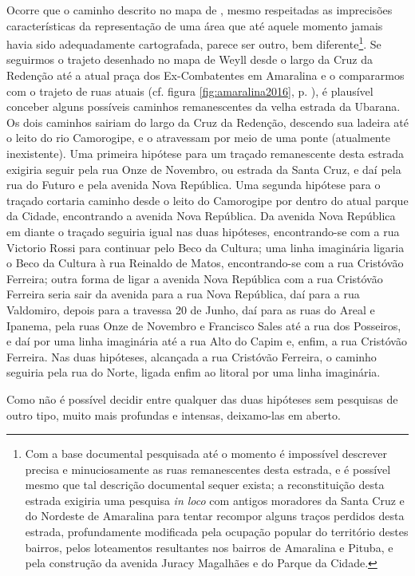 Ocorre que o caminho descrito no mapa de , mesmo respeitadas as imprecisões características da representação de uma área que até aquele momento jamais havia sido adequadamente cartografada, parece ser outro, bem diferente\footnote{Com a base documental pesquisada até o momento é impossível descrever precisa e minuciosamente as ruas remanescentes desta estrada, e é possível mesmo que tal descrição documental sequer exista; a reconstituição desta estrada exigiria uma pesquisa \textit{in loco} com antigos moradores da Santa Cruz e do Nordeste de Amaralina para tentar recompor alguns traços perdidos desta estrada, profundamente modificada pela ocupação popular do território destes bairros, pelos loteamentos resultantes nos bairros de Amaralina e Pituba, e pela construção da avenida Juracy Magalhães e do Parque da Cidade.}. Se seguirmos o trajeto desenhado no mapa de Weyll desde o largo da Cruz da Redenção até a atual praça dos Ex-Combatentes em Amaralina e o compararmos com o trajeto de ruas atuais (cf. figura \autoref{fig:amaralina2016}, p. \pageref{fig:amaralina2016}), é plausível conceber alguns possíveis caminhos remanescentes da velha estrada da Ubarana. Os dois caminhos sairiam do largo da Cruz da Redenção, descendo sua ladeira até o leito do rio Camorogipe, e o atravessam por meio de uma ponte (atualmente inexistente). Uma primeira hipótese para um traçado remanescente desta estrada exigiria seguir pela rua Onze de Novembro, ou estrada da Santa Cruz, e daí pela rua do Futuro e pela avenida Nova República. Uma segunda hipótese para o traçado cortaria caminho desde o leito do Camorogipe por dentro do atual parque da Cidade, encontrando a avenida Nova República. Da avenida Nova República em diante o traçado seguiria igual nas duas hipóteses, encontrando-se com a rua Victorio Rossi para continuar pelo Beco da Cultura; uma linha imaginária ligaria o Beco da Cultura à rua Reinaldo de Matos, encontrando-se com a rua Cristóvão Ferreira; outra forma de ligar a avenida Nova República com a rua Cristóvão Ferreira seria sair da avenida para a rua Nova República, daí para a rua Valdomiro, depois para a travessa 20 de Junho, daí para as ruas do Areal e Ipanema, pela ruas Onze de Novembro e Francisco Sales até a rua dos Posseiros, e daí por uma linha imaginária até a rua Alto do Capim e, enfim, a rua Cristóvão Ferreira. Nas duas hipóteses, alcançada a rua Cristóvão Ferreira, o caminho seguiria pela rua do Norte, ligada enfim ao litoral por uma linha imaginária. 

Como não é possível decidir entre qualquer das duas hipóteses sem pesquisas de outro tipo, muito mais profundas e intensas, deixamo-las em aberto.

